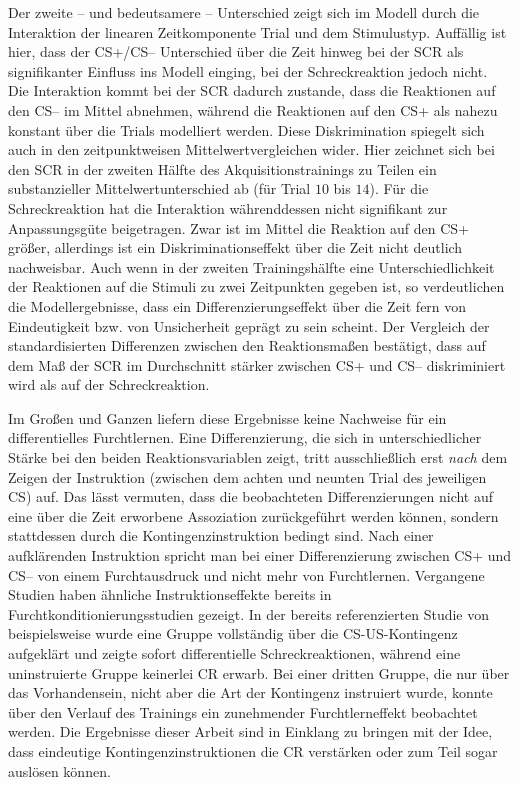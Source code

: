 	Der zweite -- und bedeutsamere -- Unterschied zeigt sich im Modell durch die Interaktion der linearen Zeitkomponente Trial und dem Stimulustyp. 
	Auffällig ist hier, dass der CS+/CS-- Unterschied über die Zeit hinweg bei der SCR als signifikanter Einfluss ins Modell einging, bei der Schreckreaktion jedoch nicht. 
	Die Interaktion kommt bei der SCR dadurch zustande, dass die Reaktionen auf den CS-- im Mittel abnehmen, während die Reaktionen auf den CS+ als nahezu konstant über die Trials modelliert werden. Diese Diskrimination spiegelt sich auch in den zeitpunktweisen Mittelwertvergleichen wider. Hier zeichnet sich bei den SCR in der zweiten Hälfte des Akquisitionstrainings zu Teilen ein substanzieller Mittelwertunterschied ab (für Trial $10$ bis $14$). 
	Für die Schreckreaktion hat die Interaktion währenddessen nicht signifikant zur Anpassungsgüte beigetragen. Zwar ist im Mittel die Reaktion auf den CS+ größer, allerdings ist ein Diskriminationseffekt über die Zeit nicht deutlich nachweisbar. Auch wenn in der zweiten Trainingshälfte eine Unterschiedlichkeit der Reaktionen auf die Stimuli zu zwei Zeitpunkten gegeben ist, so verdeutlichen die Modellergebnisse, dass ein Differenzierungseffekt über die Zeit fern von Eindeutigkeit bzw. von Unsicherheit geprägt zu sein scheint. 
	Der Vergleich der standardisierten Differenzen zwischen den Reaktionsmaßen %
	bestätigt, dass auf dem Maß der SCR im Durchschnitt stärker zwischen CS+ und CS-- diskriminiert wird als auf der Schreckreaktion. %
	
	Im Großen und Ganzen liefern diese Ergebnisse keine Nachweise für ein differentielles Furchtlernen. 
	Eine Differenzierung, die sich in unterschiedlicher Stärke bei den beiden Reaktionsvariablen zeigt, tritt ausschließlich erst \textit{nach} dem Zeigen der Instruktion (zwischen dem achten und neunten Trial des jeweiligen CS) auf. Das lässt vermuten, dass die beobachteten Differenzierungen nicht auf eine über die Zeit erworbene Assoziation zurückgeführt werden können, sondern stattdessen durch die Kontingenzinstruktion bedingt sind. Nach einer aufklärenden Instruktion spricht man bei einer Differenzierung zwischen CS+ und CS-- von einem Furchtausdruck \parencite{LONSDORF2017fc} und nicht mehr von Furchtlernen.
	Vergangene Studien haben ähnliche Instruktionseffekte bereits in Furchtkonditionierungsstudien gezeigt. In der bereits referenzierten Studie von \textcite{WEIDEMANN2016} beispielsweise wurde eine Gruppe vollständig über die CS-US-Kontingenz aufgeklärt und zeigte sofort differentielle Schreckreaktionen, während eine uninstruierte Gruppe keinerlei CR erwarb. Bei einer dritten Gruppe, die nur über das Vorhandensein, nicht aber die Art der Kontingenz instruiert wurde, konnte über den Verlauf des Trainings ein zunehmender Furchtlerneffekt beobachtet werden. 
	Die Ergebnisse dieser Arbeit sind in Einklang zu bringen mit der Idee, dass eindeutige Kontingenzinstruktionen die CR verstärken oder zum Teil sogar auslösen können. 

